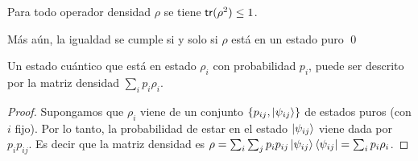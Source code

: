 \begin{teorema}
  \label{thm:TrazaCuadrado}
  Para todo operador densidad $\rho$ se tiene $\mathsf{tr}(\rho^2) \leq 1$.

  Más aún, la igualdad se cumple si y solo si $\rho$ está en un estado puro \qed
\end{teorema}

\begin{teorema}
  Un estado cuántico que está en estado $\rho_i$ con probabilidad
$p_i$, puede ser descrito por la matriz densidad $\sum_i p_i\rho_i$.
\end{teorema}
\begin{proof} Supongamos que $\rho_i$
  viene de un conjunto $\{p_{ij},\ket{\psi_{ij}}\}$ de estados
  puros (con $i$ fijo). Por lo tanto, la probabilidad de estar en
  el estado $\ket{\psi_{ij}}$ viene dada por $p_ip_{ij}$. Es decir
  que la matriz densidad es \( \rho = \sum_i\sum_j
  p_ip_{ij}\ket{\psi_{ij}}\bra{\psi_{ij}}=\sum_i p_i\rho_i \).
\end{proof}
